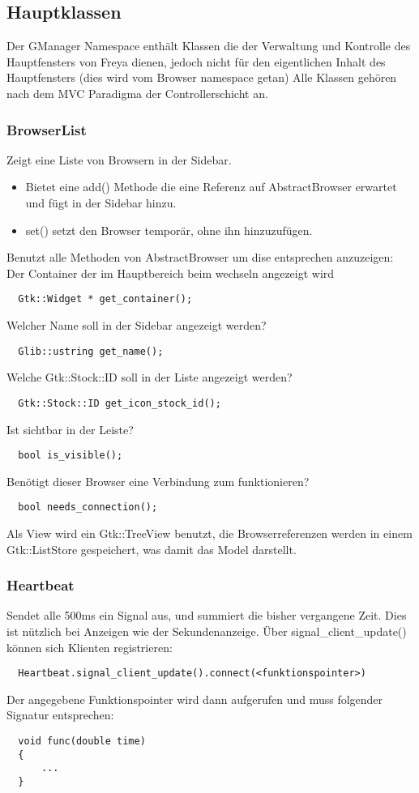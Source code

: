 \subsection{Hauptklassen}
Der GManager Namespace enthält Klassen die der Verwaltung und Kontrolle des Hauptfensters von Freya dienen,
jedoch nicht für den eigentlichen Inhalt des Hauptfensters (dies wird vom Browser namespace getan)
Alle Klassen gehören nach dem MVC Paradigma der Controllerschicht an.


\subsubsection{BrowserList}
Zeigt eine Liste von Browsern in der Sidebar.
\begin{itemize} 
\item Bietet eine add() Methode die eine Referenz auf AbstractBrowser erwartet und fügt in der Sidebar hinzu.
\item set() setzt den Browser temporär, ohne ihn hinzuzufügen.
\end{itemize}
Benutzt alle Methoden von AbstractBrowser um dise entsprechen anzuzeigen:
\\
Der Container der im Hauptbereich beim wechseln angezeigt wird
\begin{verbatim}
  Gtk::Widget * get_container();
\end{verbatim}
Welcher Name soll in der Sidebar angezeigt werden?
\begin{verbatim}
  Glib::ustring get_name();
\end{verbatim}
Welche Gtk::Stock::ID soll in der Liste angezeigt werden?
\begin{verbatim}
  Gtk::Stock::ID get_icon_stock_id();
\end{verbatim} 
Ist sichtbar in der Leiste?
\begin{verbatim}
  bool is_visible(); 
\end{verbatim}
Benötigt dieser Browser eine Verbindung zum funktionieren?
\begin{verbatim}
  bool needs_connection(); 
\end{verbatim}

Als View wird ein Gtk::TreeView benutzt, die Browserreferenzen werden in einem Gtk::ListStore gespeichert,
was damit das Model darstellt. 

\subsubsection{Heartbeat}
Sendet alle 500ms ein Signal aus, und summiert die bisher vergangene Zeit.
Dies ist nützlich bei Anzeigen wie der Sekundenanzeige.
Über signal\_client\_update() können sich Klienten registrieren:
\begin{verbatim}
  Heartbeat.signal_client_update().connect(<funktionspointer>)
\end{verbatim}
Der angegebene Funktionspointer wird dann aufgerufen und muss folgender Signatur entsprechen:
\begin{verbatim}
  void func(double time)
  {
      ...
  }
\end{verbatim}

